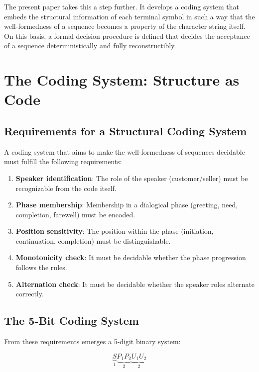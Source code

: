 \documentclass[
  12pt,
  a4paper,
  oneside,
  titlepage
]{article}
\begin{document}
The present paper takes this a step further. It develops a coding system that 
embeds the structural information of each terminal symbol in such a way that 
the well-formedness of a sequence becomes a property of the character string 
itself. On this basis, a formal decision procedure is defined that decides the 
acceptance of a sequence deterministically and fully reconstructibly.

\section{The Coding System: Structure as Code}

\subsection{Requirements for a Structural Coding System}

A coding system that aims to make the well-formedness of sequences decidable 
must fulfill the following requirements:

\begin{enumerate}
    \item \textbf{Speaker identification}: The role of the speaker 
    (customer/seller) must be recognizable from the code itself.
    
    \item \textbf{Phase membership}: Membership in a dialogical phase 
    (greeting, need, completion, farewell) must be encoded.
    
    \item \textbf{Position sensitivity}: The position within the phase 
    (initiation, continuation, completion) must be distinguishable.
    
    \item \textbf{Monotonicity check}: It must be decidable whether the 
    phase progression follows the rules.
    
    \item \textbf{Alternation check}: It must be decidable whether the 
    speaker roles alternate correctly.
\end{enumerate}

\subsection{The 5-Bit Coding System}

From these requirements emerges a 5-digit binary system:

\[
\underbrace{S}_{1} \underbrace{P_1P_2}_{2} \underbrace{U_1U_2}_{2}
\]
\end{document}

